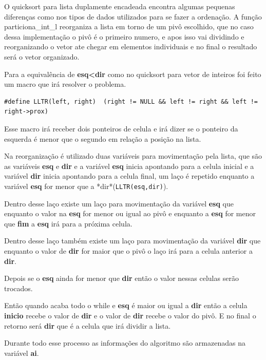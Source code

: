 \documentclass[11pt]{article}
\begin{document}
O quicksort para lista duplamente encadeada encontra algumas pequenas diferenças como nos tipos de dados utilizados para se fazer a ordenação. A função particiona\_int\_l reorganiza a lista em torno de um pivô escolhido, que no caso dessa implementação o pivô é o primeiro numero, e apos isso vai dividindo e reorganizando o vetor ate chegar em elementos individuais e no final o resultado será o vetor organizado.

Para a equivalência de \textbf{esq<dir} como no quicksort para vetor de inteiros foi feito um macro que irá resolver o problema.

\begin{verbatim}
#define LLTR(left, right)  (right != NULL && left != right && left != right->prox)

\end{verbatim}

Esse macro irá receber dois ponteiros de celula e irá dizer se o ponteiro da esquerda é menor que o segundo em relação a posição na lista.

Na reorganização é utilizado duas variáveis para movimentação pela lista, que são as variáveis \textbf{esq} e \textbf{dir} e a variável \textbf{esq} inicia apontando para a celula inicial e a variável \textbf{dir} inicia apontando para a celula final, um laço é repetido enquanto a variável \textbf{esq} for menor que a *dir*(\texttt{LLTR(esq,dir)}). 

Dentro desse laço existe um laço para movimentação da variável \textbf{esq} que enquanto o valor na \textbf{esq} for menor ou igual ao pivô e enquanto a \textbf{esq} for menor que \textbf{fim} a \textbf{esq} irá para a próxima celula.

Dentro desse laço também existe um laço para movimentação da variável \textbf{dir} que enquanto o valor de \textbf{dir} for maior que o pivô o laço irá para a celula anterior a \textbf{dir}.

Depois se o \textbf{esq} ainda for menor que \textbf{dir} então o valor nessas celulas serão trocados.

Então quando acaba todo o while e \textbf{esq} é maior ou igual a \textbf{dir} então a celula \textbf{inicio} recebe o valor de \textbf{dir} e o valor de \textbf{dir} recebe o valor do pivô. E no final o retorno será \textbf{dir} que é a celula que irá dividir a lista.

Durante todo esse processo as informações do algoritmo são armazenadas na variável \textbf{ai}.
\end{document}

